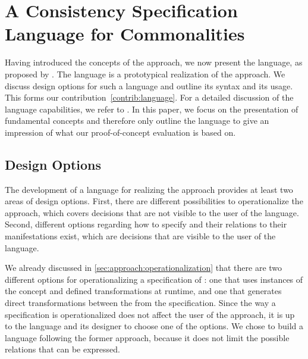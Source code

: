 \chapter{A Consistency Specification Language for Commonalities 
}
\label{chap:language}

Having introduced the concepts of the \commonalities approach, we now present the \commonalities language, as proposed by \textcite{gleitze2017a}.
The language is a prototypical realization of the approach.
We discuss design options for such a language and outline its syntax and its usage.
This forms our contribution~\ref{contrib:language}.
For a detailed discussion of the language capabilities, we refer to \cite{gleitze2017a}.
In this paper, we focus on the presentation of fundamental concepts  and therefore only outline the language to give an impression of what our proof-of-concept evaluation is based on.


\section{Design Options}

The development of a language for realizing the \commonalities approach provides at least two areas of design options.
First, there are different possibilities to operationalize the approach, which covers decisions that are not visible to the user of the language.
Second, different options regarding how to specify \conceptmetamodels and their relations to their manifestations exist, which are decisions that are visible to the user of the language.

We already discussed in \autoref{sec:approach:operationalization} that there are two different options for operationalizing a specification of \commonalities: one that uses instances of the concept \metamodels and defined transformations at runtime, and one that generates direct transformations between the \concretemetamodels from the specification.
Since the way a specification is operationalized does not affect the user of the approach, it is up to the language and its designer to choose one of the options.
We chose to build a language following the former approach, because it does not limit the possible relations that can be expressed.

